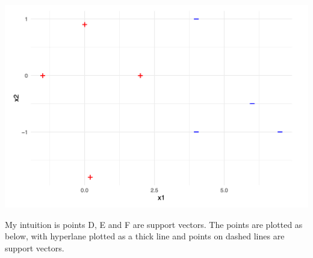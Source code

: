 \documentclass[
]{article}
\begin{document}
\includegraphics[width=21.1in]{data/p15}

My intuition is points D, E and F are support vectors. The points are
plotted as below, with hyperlane plotted as a thick line and points on
dashed lines are support vectors.
\end{document}
